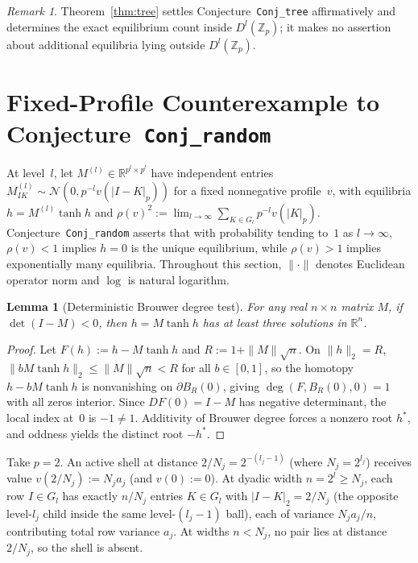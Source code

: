 \documentclass[11pt]{article}
\theoremstyle{plain}
\newtheorem{lemma}[theorem]{Lemma}
\theoremstyle{definition}
\theoremstyle{remark}
\newtheorem{remark}{Remark}
\begin{document}
\begin{remark}
Theorem~\ref{thm:tree} settles Conjecture~\texttt{Conj\_tree} affirmatively and determines the exact equilibrium count inside $D^l(\mathbb{Z}_p)$; it makes no assertion about additional equilibria lying outside $D^l(\mathbb{Z}_p)$.
\end{remark}

\section{Fixed-Profile Counterexample to Conjecture~\texttt{Conj\_random}}

At level~$l$, let $M^{(l)} \in \mathbb{R}^{p^l \times p^l}$ have independent entries $M^{(l)}_{IK} \sim \mathcal{N}(0, p^{-l} v(|I - K|_p))$ for a fixed nonnegative profile~$v$, with equilibria $h = M^{(l)}\tanh h$ and $\rho(v)^2 := \lim_{l \to \infty} \sum_{K \in G_l} p^{-l} v(|K|_p)$. Conjecture~\texttt{Conj\_random} asserts that with probability tending to~$1$ as $l \to \infty$, $\rho(v) < 1$ implies $h = 0$ is the unique equilibrium, while $\rho(v) > 1$ implies exponentially many equilibria. Throughout this section, $\|\cdot\|$ denotes Euclidean operator norm and $\log$ is natural logarithm.

\begin{lemma}[Deterministic Brouwer degree test]\label{lem:degree}
For any real $n \times n$ matrix $M$, if $\det(I - M) < 0$, then $h = M\tanh h$ has at least three solutions in $\mathbb{R}^n$.
\end{lemma}

\begin{proof}
Let $F(h) := h - M\tanh h$ and $R := 1 + \|M\|\sqrt{n}$. On $\|h\|_2 = R$, $\|b M\tanh h\|_2 \le \|M\|\sqrt{n} < R$ for all $b \in [0, 1]$, so the homotopy $h - b M\tanh h$ is nonvanishing on $\partial B_R(0)$, giving $\deg(F, B_R(0), 0) = 1$ with all zeros interior. Since $DF(0) = I - M$ has negative determinant, the local index at~$0$ is $-1 \neq 1$. Additivity of Brouwer degree forces a nonzero root $h^*$, and oddness yields the distinct root $-h^*$.
\end{proof}

Take $p = 2$. An active shell at distance $2/N_j = 2^{-(l_j - 1)}$ (where $N_j = 2^{l_j}$) receives value $v(2/N_j) := N_j a_j$ (and $v(0) := 0$). At dyadic width $n = 2^l \ge N_j$, each row $I \in G_l$ has exactly $n/N_j$ entries $K \in G_l$ with $|I - K|_2 = 2/N_j$ (the opposite level-$l_j$ child inside the same level-$(l_j - 1)$ ball), each of variance $N_j a_j / n$, contributing total row variance $a_j$. At widths $n < N_j$, no pair lies at distance $2/N_j$, so the shell is absent.
\end{document}

